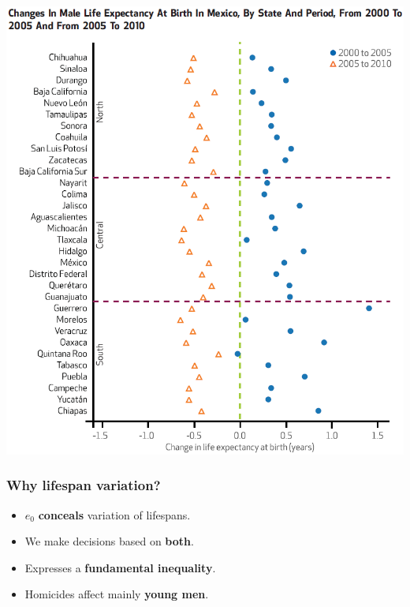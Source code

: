 \documentclass[xcolor={dvipsnames}]{beamer}
\begin{document}
\begin{frame}

\begin{center}
		\includegraphics[scale=.423]{Figures/State_changes_e0}
				\end{center}			
		

\end{frame}



\begin{frame}\frametitle{Why lifespan variation?}
\Large{
		\begin{itemize}
		
		\item<1-> $e_0$ \textbf{conceals} variation of lifespans.

		\item<2-> We make decisions based on \textbf{both}.
		
		\item<3-> Expresses a \textbf{fundamental inequality}.
		
		\item<4-> Homicides affect mainly \textbf{young men}.
						
		\end{itemize}

}
\end{frame}
\end{document}
